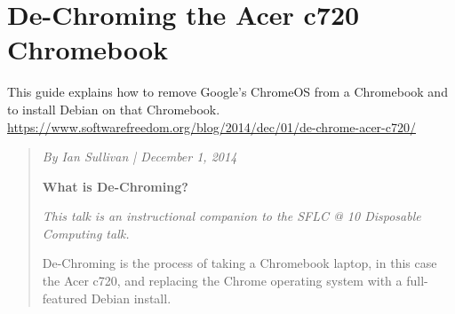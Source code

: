 \documentclass[a4paper,12pt]{article}
\begin{document}
\section{De-Chroming the Acer c720 Chromebook}
This guide explains how to remove Google's ChromeOS from a Chromebook and to install Debian on that Chromebook.
\url{https://www.softwarefreedom.org/blog/2014/dec/01/de-chrome-acer-c720/}
\begin{quotation}
\textit{By Ian Sullivan | December 1, 2014}

\textbf{What is De-Chroming?}

\textit{This talk is an instructional companion to the SFLC @ 10 Disposable Computing talk.}

De-Chroming is the process of taking a Chromebook laptop, in this case the Acer c720, and replacing the Chrome operating system with a full-featured Debian install.
\end{quotation}
\end{document}
